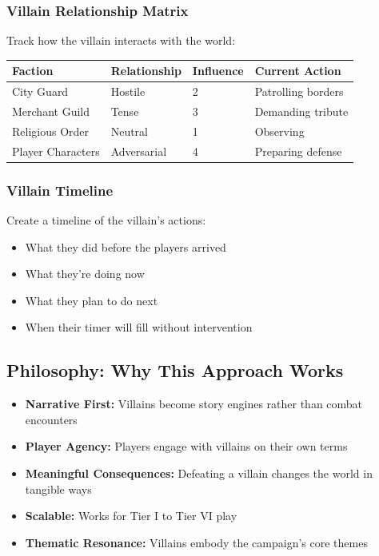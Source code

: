 \documentclass[10pt]{article}
\begin{document}
\subsubsection{Villain Relationship Matrix}

Track how the villain interacts with the world:

\begin{center}
\begin{tabular}{|p{}|p{}|p{}|p{}|}
\hline
\textbf{Faction} & \textbf{Relationship} & \textbf{Influence} & \textbf{Current Action} \\ \hline
City Guard & Hostile & 2 & Patrolling borders \\ \hline
Merchant Guild & Tense & 3 & Demanding tribute \\ \hline
Religious Order & Neutral & 1 & Observing \\ \hline
Player Characters & Adversarial & 4 & Preparing defense \\ \hline
\end{tabular}
\end{center}

\subsubsection{Villain Timeline}

Create a timeline of the villain's actions:
\begin{itemize}
  \item What they did before the players arrived
  \item What they're doing now
  \item What they plan to do next
  \item When their timer will fill without intervention
\end{itemize}

\subsection{Philosophy: Why This Approach Works}

\begin{itemize}
  \item \textbf{Narrative First:} Villains become story engines rather than combat encounters
  \item \textbf{Player Agency:} Players engage with villains on their own terms
  \item \textbf{Meaningful Consequences:} Defeating a villain changes the world in tangible ways
  \item \textbf{Scalable:} Works for Tier I to Tier VI play
  \item \textbf{Thematic Resonance:} Villains embody the campaign's core themes
\end{itemize}
\end{document}
